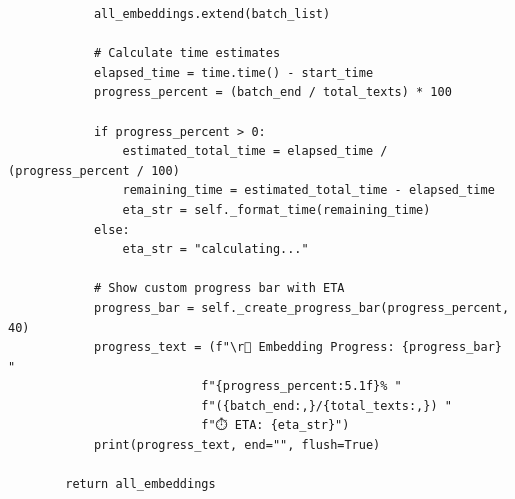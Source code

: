 \begin{verbatim}
            all_embeddings.extend(batch_list)
            
            # Calculate time estimates
            elapsed_time = time.time() - start_time
            progress_percent = (batch_end / total_texts) * 100
            
            if progress_percent > 0:
                estimated_total_time = elapsed_time / (progress_percent / 100)
                remaining_time = estimated_total_time - elapsed_time
                eta_str = self._format_time(remaining_time)
            else:
                eta_str = "calculating..."
            
            # Show custom progress bar with ETA
            progress_bar = self._create_progress_bar(progress_percent, 40)
            progress_text = (f"\r🔄 Embedding Progress: {progress_bar} "
                           f"{progress_percent:5.1f}% "
                           f"({batch_end:,}/{total_texts:,}) "
                           f"⏱️ ETA: {eta_str}")
            print(progress_text, end="", flush=True)
        
        return all_embeddings
\end{verbatim}

